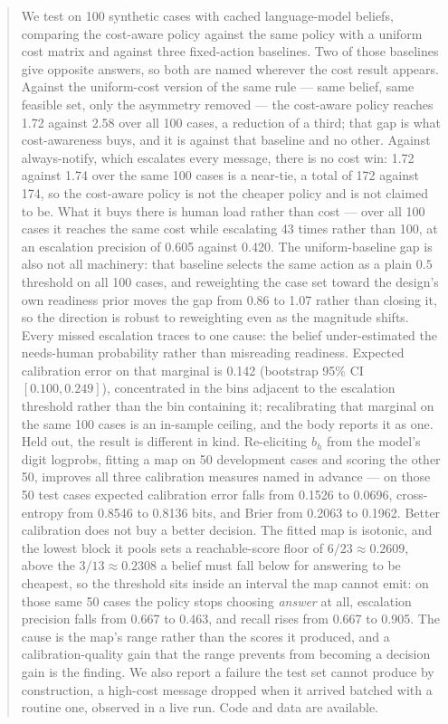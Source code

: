 \documentclass{article}
\begin{document}
\begin{abstract}
We test on 100 synthetic cases with cached language-model beliefs, comparing the
cost-aware policy against the same policy with a uniform cost matrix and against
three fixed-action baselines. Two of those baselines give opposite answers, so
both are named wherever the cost result appears. Against the uniform-cost version
of the same rule --- same belief, same feasible set, only the asymmetry removed
--- the cost-aware policy reaches 1.72 against 2.58 over all 100 cases, a
reduction of a third; that gap is what cost-awareness buys, and it is against that
baseline and no other. Against always-notify, which escalates every message, there
is no cost win: 1.72 against 1.74 over the same 100 cases is a near-tie, a total
of 172 against 174, so the cost-aware policy is not
the cheaper policy and is not claimed to be. What it buys there is human load
rather than cost --- over all 100 cases it reaches the same cost while escalating
43 times rather than 100, at an escalation precision of 0.605 against 0.420. The
uniform-baseline gap is also not all machinery: that baseline selects the same
action as a plain $0.5$ threshold on all 100 cases, and reweighting the case set
toward the design's own readiness prior moves the gap from 0.86 to 1.07 rather
than closing it, so the direction is robust to reweighting even as the magnitude
shifts. Every missed escalation traces to one cause: the belief under-estimated the
needs-human probability rather than misreading readiness. Expected calibration error
on that marginal is 0.142 (bootstrap 95\% CI $[0.100, 0.249]$), concentrated in the
bins adjacent to the escalation threshold rather than the bin containing it;
recalibrating that marginal on the same 100 cases is an in-sample ceiling, and the
body reports it as one. Held out, the result is different in kind. Re-eliciting
$b_h$ from the model's digit logprobs, fitting a map on 50 development cases and
scoring the other 50, improves all three calibration measures named in advance ---
on those 50 test cases expected calibration error falls from 0.1526 to 0.0696,
cross-entropy from 0.8546 to 0.8136 bits, and Brier from 0.2063 to 0.1962. Better
calibration does not buy a better decision. The fitted map is isotonic, and the
lowest block it pools sets a reachable-score floor of $6/23 \approx 0.2609$, above
the $3/13 \approx 0.2308$ a belief must fall below for answering to be cheapest, so
the threshold sits inside an interval the map cannot emit: on those same 50 cases
the policy stops choosing \emph{answer} at all, escalation precision falls from
0.667 to 0.463, and recall rises from 0.667 to 0.905. The cause is the map's range
rather than the scores it produced, and a calibration-quality gain that the range
prevents from becoming a decision gain is the finding. We
also report a failure the test set cannot produce by construction, a high-cost
message dropped when it arrived batched with a routine one, observed in a live
run. Code and data are available.
\end{abstract}
\end{document}
